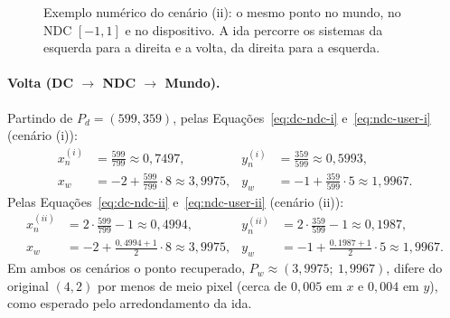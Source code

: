 \begin{figure}[H]
    \centering
    \caption{Exemplo numérico do cenário (ii): o mesmo ponto no mundo, no NDC $[-1,1]$ e no dispositivo. A ida percorre os sistemas da esquerda para a direita e a volta, da direita para a esquerda.}
    \label{fig:exemplo-ii}
\end{figure}

\paragraph{Volta (DC $\rightarrow$ NDC $\rightarrow$ Mundo).} Partindo de $P_d = (599, 359)$, pelas Equações~\eqref{eq:dc-ndc-i} e~\eqref{eq:ndc-user-i} (cenário (i)):
\begin{align*}
    x_n^{(i)} &= \frac{599}{799} \approx 0{,}7497, &
    y_n^{(i)} &= \frac{359}{599} \approx 0{,}5993, \\
    x_w &= -2 + \frac{599}{799} \cdot 8 \approx 3{,}9975, &
    y_w &= -1 + \frac{359}{599} \cdot 5 \approx 1{,}9967.
\end{align*}
Pelas Equações~\eqref{eq:dc-ndc-ii} e~\eqref{eq:ndc-user-ii} (cenário (ii)):
\begin{align*}
    x_n^{(ii)} &= 2 \cdot \frac{599}{799} - 1 \approx 0{,}4994, &
    y_n^{(ii)} &= 2 \cdot \frac{359}{599} - 1 \approx 0{,}1987, \\
    x_w &= -2 + \frac{0{,}4994 + 1}{2} \cdot 8 \approx 3{,}9975, &
    y_w &= -1 + \frac{0{,}1987 + 1}{2} \cdot 5 \approx 1{,}9967.
\end{align*}
Em ambos os cenários o ponto recuperado, $P_w \approx (3{,}9975;\ 1{,}9967)$, difere do original $(4,2)$ por menos de meio pixel (cerca de $0{,}005$ em $x$ e $0{,}004$ em $y$), como esperado pelo arredondamento da ida.
